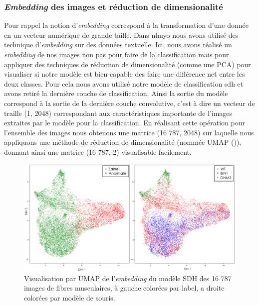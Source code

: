 \subsubsection{\textit{Embedding} des images et réduction de dimensionalité} 
Pour rappel la notion d'\textit{embedding} correspond  à la transformation d'une donnée en un vecteur numérique de grande taille. Dans \gls{nlmyo} nous avons utilisé des technique d'\textit{embedding} sur des données textuelle. Ici, nous avons réalisé un \textit{embedding} de nos images non pas pour faire de la classification mais pour appliquer des  techniques de réduction de dimensionalité (comme une PCA) pour visualiser si notre modèle est bien capable des faire une différence net entre les deux classes.
Pour cela nous avons utilisé notre modèle de classification \gls{sdh} et avons retiré la dernière couche de classification. Ainsi la sortie du modèle correspond à la sortie de la dernière couche convolutive, c'est à dire un vecteur de traille (1, 2048) correspondant aux caractéristiques importante de l'images extraites par le modèle pour la classification.  En réalisant cette opération pour l'ensemble des images nous obtenons une matrice (16 787, 2048) sur laquelle nous appliquons une méthode de réduction de dimensionalité (nommée UMAP (\cite{mcinnes_umap_2020})), donnant ainsi une matrice (16 787, 2) visualisable facilement.
\begin{figure}[htbp]
 \centering
 \includegraphics[width=1\textwidth]{figures/umap_sdh.png}
 \caption[Visualisation par UMAP de l'\textit{embedding} du modèle SDH]{Visualisation par UMAP de l'\textit{embedding} du modèle SDH des 16 787 images de fibres musculaires, à gauche colorées par label, a droite colorées par modèle de souris.}
 \label{fig:umap_sdh}
\end{figure}

